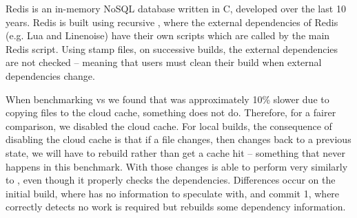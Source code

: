 Redis is an in-memory NoSQL database written in C, developed over the last 10 years. Redis is built using recursive \Make \cite{miller:recursive_make}, where the external dependencies of Redis (e.g. Lua and Linenoise) have their own \Make scripts which are called by the main Redis \Make script. Using stamp files, on successive builds, the external dependencies are not checked -- meaning that users must clean their build when external dependencies change.

When benchmarking \Rattle vs \Make we found that \Rattle was approximately 10\% slower due to copying files to the cloud cache, something \Make does not do. Therefore, for a fairer comparison, we disabled the cloud cache. For local builds, the consequence of disabling the cloud cache is that if a file changes, then changes back to a previous state, we will have to rebuild rather than get a cache hit -- something that never happens in this benchmark. With those changes \Rattle is able to perform very similarly to \Make, even though it properly checks the dependencies. Differences occur on the initial build, where \Rattle has no information to speculate with, and commit 1, where \Rattle correctly detects no work is required but \Make rebuilds some dependency information.

\begin{comment}
\subsection{Reimplementing Stack}

\Rattle assumes that each command is atomic - it cannot be subdivided into smaller parts. If a command is secretly two independent commands then they should usually be expressed as such so they can be individually skipped.

Compound commands: Sometimes a command will produce something that is user specific (not great for caching), but the next step will remove the user specificity (good for caching). To fix that we allow compound commands, by conjoining two commands with \texttt{\&\&}. Sometimes the sole purpose of the second command can be to strip machine-unique data from the first command.

As another example, the GHC package database has additional entries added every time a package is installed, making the output a consequence of the original file\footnote{As a consequence many build systems, including \Bazel and \Rattle, use multiple package databases with only one entry per database}.

and some memoisation operations (\texttt{memo})
\end{comment}

